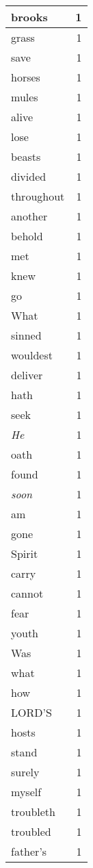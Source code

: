 \begin{center}
\begin{longtable}{l|r}
brooks & 1\\ \hline 
grass & 1\\ \hline 
save & 1\\ \hline 
horses & 1\\ \hline 
mules & 1\\ \hline 
alive & 1\\ \hline 
lose & 1\\ \hline 
beasts & 1\\ \hline 
divided & 1\\ \hline 
throughout & 1\\ \hline 
another & 1\\ \hline 
behold & 1\\ \hline 
met & 1\\ \hline 
knew & 1\\ \hline 
go & 1\\ \hline 
What & 1\\ \hline 
sinned & 1\\ \hline 
wouldest & 1\\ \hline 
deliver & 1\\ \hline 
hath & 1\\ \hline 
seek & 1\\ \hline 
\emph{He} & 1\\ \hline 
oath & 1\\ \hline 
found & 1\\ \hline 
\emph{soon} & 1\\ \hline 
am & 1\\ \hline 
gone & 1\\ \hline 
Spirit & 1\\ \hline 
carry & 1\\ \hline 
cannot & 1\\ \hline 
fear & 1\\ \hline 
youth & 1\\ \hline 
Was & 1\\ \hline 
what & 1\\ \hline 
how & 1\\ \hline 
LORD'S & 1\\ \hline 
hosts & 1\\ \hline 
stand & 1\\ \hline 
surely & 1\\ \hline 
myself & 1\\ \hline 
troubleth & 1\\ \hline 
troubled & 1\\ \hline 
father's & 1\\ \hline 

\end{longtable}
\end{center}
